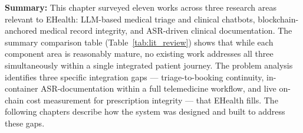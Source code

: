 \noindent\textbf{Summary:} This chapter surveyed eleven works across three research areas relevant to EHealth: LLM-based medical triage and clinical chatbots, blockchain-anchored medical record integrity, and ASR-driven clinical documentation. The summary comparison table (Table~\ref{tab:lit_review}) shows that while each component area is reasonably mature, no existing work addresses all three simultaneously within a single integrated patient journey. The problem analysis identifies three specific integration gaps --- triage-to-booking continuity, in-container ASR-documentation within a full telemedicine workflow, and live on-chain cost measurement for prescription integrity --- that EHealth fills. The following chapters describe how the system was designed and built to address these gaps.